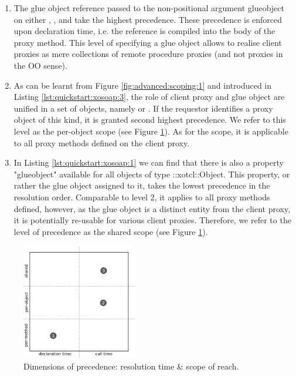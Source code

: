 \begin{enumerate}
\item The glue object reference passed to the non-positional argument glueobject on either , ,  and  take the highest precedence. These precedence is enforced upon declaration time, i.e. the reference is compiled into the body of the proxy method. This level of specifying a glue object allows to realise client proxies as mere collections of remote procedure proxies (and not proxies in the OO sense).
\item As can be learnt from Figure \ref{fig:advanced:scoping:1} and introduced in Listing \ref{lst:quickstart:xosoap:3}, the role of client proxy and glue object are unified in a set of objects, namely  or  . If the requestor identifies a proxy object of this kind, it is granted second highest precedence. We refer to this level as the per-object scope (see Figure \ref{fig:advanced:scoping:2}). As for the scope, it is applicable to all proxy methods defined on the client proxy.
\item In Listing \ref{lst:quickstart:xosoap:1} we can find that there is also a property "glueobject" available for all objects of type ::xotcl::Object. This property, or rather the glue object assigned to it, takes the lowest precedence in the resolution order. Comparable to level 2, it applies to all proxy methods defined, however, as the glue object is a distinct entity from the client proxy, it is potentially re-usable for various client proxies. Therefore, we refer to the level of precedence as the shared scope (see Figure \ref{fig:advanced:scoping:2}).
\end{enumerate}
  \begin{figure}[htbp]
\begin{center}
\includegraphics[width=0.45\textwidth]{img/scoping-glue-objects-scheme.png}
\caption{Dimensions of precedence: resolution time \& scope of reach.}
\label{fig:advanced:scoping:2}
\end{center}
\end{figure}
